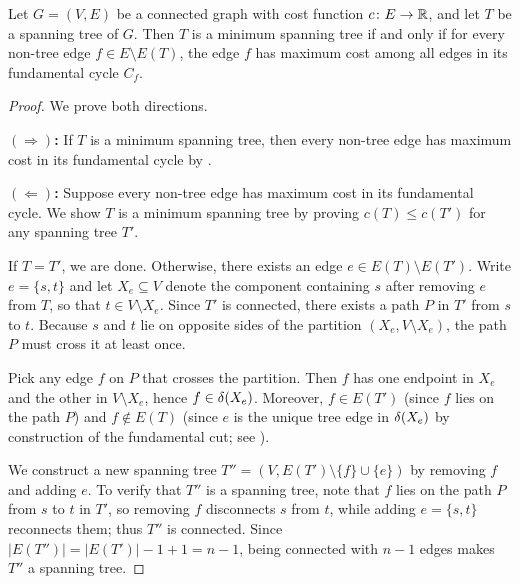 

\begin{theorem}\label{thm:cycle-criterion}
Let $G = (V, E)$ be a connected graph with cost function $c \colon E \to \mathbb{R}$, and let $T$ be a spanning tree of $G$.
Then $T$ is a minimum spanning tree if and only if for every non-tree edge $f \in E \setminus E(T)$, the edge $f$ has maximum cost among all edges in its fundamental cycle $C_f$.
\end{theorem}

\begin{proof}
We prove both directions.

\textbf{$(\Rightarrow)$:}
If $T$ is a minimum spanning tree, then every non-tree edge has maximum cost in its fundamental cycle by .

\textbf{$(\Leftarrow)$:}
Suppose every non-tree edge has maximum cost in its fundamental cycle.
We show $T$ is a minimum spanning tree by proving $c(T) \leq c(T')$ for any spanning tree $T'$.

If $T = T'$, we are done.
Otherwise, there exists an edge $e \in E(T) \setminus E(T')$.
Write $e = \{s, t\}$ and let $X_e \subseteq V$ denote the component containing $s$ after removing $e$ from $T$, so that $t \in V \setminus X_e$.
Since $T'$ is connected, there exists a path $P$ in $T'$ from $s$ to $t$.
Because $s$ and $t$ lie on opposite sides of the partition $(X_e, V \setminus X_e)$, the path $P$ must cross it at least once.

Pick any edge $f$ on $P$ that crosses the partition.
Then $f$ has one endpoint in $X_e$ and the other in $V \setminus X_e$, hence $f \in \delta(X_e)$.
Moreover, $f \in E(T')$ (since $f$ lies on the path $P$) and $f \notin E(T)$ (since $e$ is the unique tree edge in $\delta(X_e)$ by construction of the fundamental cut; see ).

We construct a new spanning tree $T'' = (V, E(T') \setminus \{f\} \cup \{e\})$ by removing $f$ and adding $e$.
To verify that $T''$ is a spanning tree, note that $f$ lies on the path $P$ from $s$ to $t$ in $T'$, so removing $f$ disconnects $s$ from $t$, while adding $e = \{s, t\}$ reconnects them; thus $T''$ is connected.
Since $|E(T'')| = |E(T')| - 1 + 1 = n - 1$, being connected with $n - 1$ edges makes $T''$ a spanning tree.


\end{proof}

